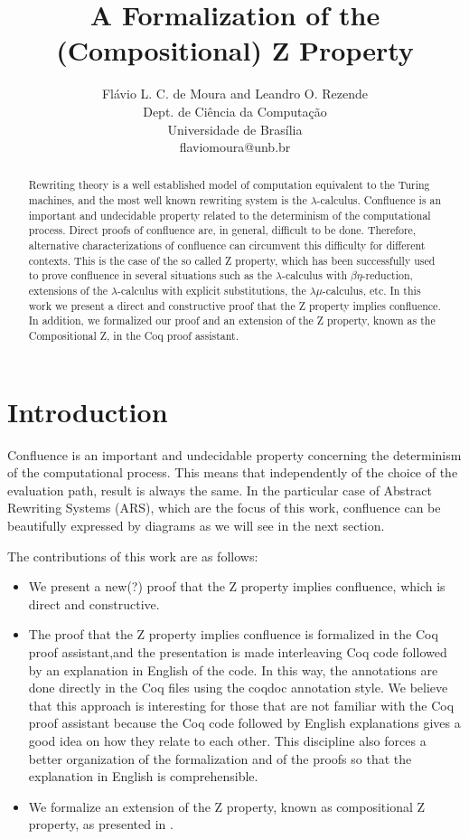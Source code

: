 \documentclass[a4paper]{article}
\title{A Formalization of the (Compositional) Z Property}
\author{
Flávio L. C. de Moura and Leandro O. Rezende\\ Dept. de Ciência da Computação\\
                Universidade de Brasília \\ flaviomoura@unb.br
}
\newcommand{\flavio}[1]{{\color{red}#1}}
\begin{document}
\maketitle

\begin{abstract}
  Rewriting theory is a well established model of computation
  equivalent to the Turing machines, and the most well known rewriting
  system is the $\lambda$-calculus. Confluence is an important and
  undecidable property related to the determinism of the computational
  process. Direct proofs of confluence are, in general, difficult to
  be done. Therefore, alternative characterizations of confluence can
  circumvent this difficulty for different contexts. This is the case
  of the so called Z property, which has been successfully used to
  prove confluence in several situations such as the
  $\lambda$-calculus with $\beta\eta$-reduction, extensions of the
  $\lambda$-calculus with explicit substitutions, the
  $\lambda\mu$-calculus, etc. In this work we present a direct and
  constructive proof that the Z property implies confluence.  In
  addition, we formalized our proof and an extension of the Z
  property, known as the Compositional Z, in the Coq proof assistant.
\end{abstract}
\vskip 32pt


\section{Introduction}

Confluence is an important and undecidable property concerning the
determinism of the computational process. This means that
independently of the choice of the evaluation path, result is always
the same. In the particular case of Abstract Rewriting Systems (ARS),
which are the focus of this work, confluence can be beautifully
expressed by diagrams as we will see in the next section.

The contributions of this work are as follows:
\begin{itemize}
\item We present a \flavio{new(?)} proof that the Z property implies confluence,
  which is direct and constructive.
\item The proof that the Z property implies confluence is formalized
  in the Coq proof assistant,\flavio{and the presentation is made
  interleaving Coq code followed by an explanation in English of the
  code. In this way, the annotations are done directly in the Coq
  files using the coqdoc annotation style. We believe that this
  approach is interesting for those that are not familiar with the Coq
  proof assistant because the Coq code followed by English
  explanations gives a good idea on how they relate to each
  other. This discipline also forces a better organization of the
  formalization and of the proofs so that the explanation in English
  is comprehensible.}
\item We formalize an extension of the Z property, known as
  compositional Z property, as presented in
  \cite{Nakazawa-Fujita2016}.
\end{itemize}
\end{document}
